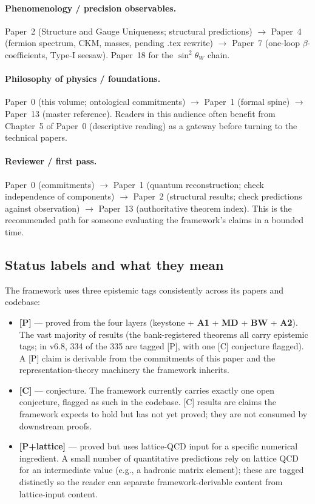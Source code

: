 \documentclass[11pt]{article}
\newcommand{\Aone}{\textbf{A1}}
\begin{document}
\paragraph{Phenomenology / precision observables.} Paper~2 (Structure and Gauge Uniqueness; structural predictions) $\to$ Paper~4 (fermion spectrum, CKM, masses, pending .tex rewrite) $\to$ Paper~7 (one-loop $\beta$-coefficients, Type-I seesaw). Paper~18 for the $\sin^2\theta_W$ chain.

\paragraph{Philosophy of physics / foundations.} Paper~0 (this volume; ontological commitments) $\to$ Paper~1 (formal spine) $\to$ Paper~13 (master reference). Readers in this audience often benefit from Chapter~5 of Paper~0 (descriptive reading) as a gateway before turning to the technical papers.

\paragraph{Reviewer / first pass.} Paper~0 (commitments) $\to$ Paper~1 (quantum reconstruction; check independence of components) $\to$ Paper~2 (structural results; check predictions against observation) $\to$ Paper~13 (authoritative theorem index). This is the recommended path for someone evaluating the framework's claims in a bounded time.

\subsection{Status labels and what they mean}\label{sec:status_labels}

The framework uses three epistemic tags consistently across its papers and codebase:

\begin{itemize}
    \item \textbf{[P]} --- proved from the four layers (keystone + \Aone{} + \textbf{MD} + \textbf{BW} + \textbf{A2}). The vast majority of results (the bank-registered theorems all carry epistemic tags; in v6.8, 334 of the 335 are tagged [P], with one [C] conjecture flagged). A [P] claim is derivable from the commitments of this paper and the representation-theory machinery the framework inherits.
    \item \textbf{[C]} --- conjecture. The framework currently carries exactly one open conjecture, flagged as such in the codebase. [C] results are claims the framework expects to hold but has not yet proved; they are not consumed by downstream proofs.
    \item \textbf{[P+lattice]} --- proved but uses lattice-QCD input for a specific numerical ingredient. A small number of quantitative predictions rely on lattice QCD for an intermediate value (e.g., a hadronic matrix element); these are tagged distinctly so the reader can separate framework-derivable content from lattice-input content.
\end{itemize}
\end{document}

